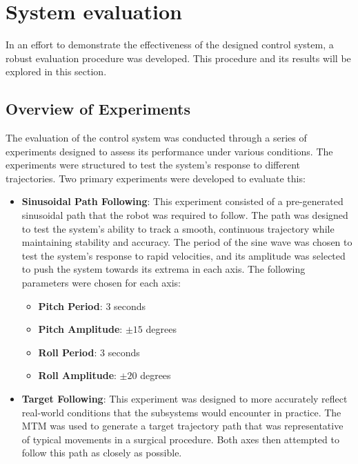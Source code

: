 \chapter{System evaluation}
\label{chapter:results}

In an effort to demonstrate the effectiveness of the designed control system, a robust evaluation procedure was developed. This procedure and its results will be explored in this section.


\section{Overview of Experiments}
\label{section:experiment_overview}

The evaluation of the control system was conducted through a series of experiments designed to assess its performance under various conditions. The experiments were structured to test the system's response to different trajectories. Two primary experiments were developed to evaluate this:

\begin{itemize}
    \item \textbf{Sinusoidal Path Following}: This experiment consisted of a pre-generated sinusoidal path that the robot was required to follow. The path was designed to test the system's ability to track a smooth, continuous trajectory while maintaining stability and accuracy. The period of the sine wave was chosen to test the system's response to rapid velocities, and its amplitude was selected to push the system towards its extrema in each axis. The following parameters were chosen for each axis:
    \begin{itemize}
        \item \textbf{Pitch Period}: 3 seconds
        \item \textbf{Pitch Amplitude}: $\pm 15$ degrees
        \item \textbf{Roll Period}: 3 seconds
        \item \textbf{Roll Amplitude}: $\pm 20$ degrees
    \end{itemize}
    
    \item \textbf{Target Following}: This experiment was designed to more accurately reflect real-world conditions that the subsystems would encounter in practice. The MTM was used to generate a target trajectory path that was representative of typical movements in a surgical procedure. Both axes then attempted to follow this path as closely as possible.
\end{itemize}

